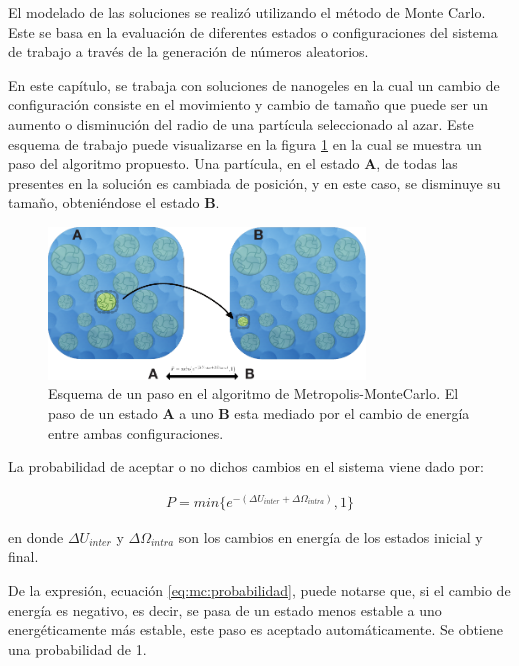 	El modelado de las soluciones se realiz\'o utilizando el m\'etodo de Monte Carlo. Este se basa en la evaluaci\'on de diferentes estados o configuraciones del sistema de trabajo a trav\'es de la generaci\'on de n\'umeros aleatorios.
	
	En este cap\'itulo, se trabaja con soluciones de nanogeles en la cual un cambio de configuraci\'on consiste en el movimiento y cambio de tama\~no que puede ser un aumento o disminuci\'on  del radio de una part\'icula seleccionado al azar. Este esquema de trabajo puede visualizarse en la figura \ref{fig:mc:pasos_mc} en la cual se muestra un paso del algoritmo propuesto. Una part\'icula, en el estado \textbf{A}, de todas las presentes en la soluci\'on es cambiada de posici\'on, y en este caso, se disminuye su tama\~no, obteni\'endose el estado \textbf{B}.
	
	\begin{figure}[!htb]
		\centering
		\includegraphics[width=0.75\textwidth]{Figures/modelos/mc_model.pdf}
		\caption{Esquema de un paso en el algoritmo de Metropolis-MonteCarlo. El paso de un estado \textbf{A} a uno \textbf{B} esta mediado por el cambio de energ\'ia entre ambas configuraciones. }
		\label{fig:mc:pasos_mc}
	\end{figure}
	
	La probabilidad de aceptar o no dichos cambios en el sistema viene dado por:
	
	\begin{align}
		P = min \{e^{-(\Delta U_{inter} + \Delta \Omega_{intra})},1\}
		\label{eq:mc:probabilidad}
	\end{align}
	
	\noindent en donde $\Delta U_{inter}$ y $\Delta\Omega_{intra}$ son los cambios en energ\'ia de los estados inicial y final. 
	
		De la expresi\'on, ecuaci\'on \ref{eq:mc:probabilidad}, puede notarse que, si el cambio de energ\'ia es negativo, es decir, se pasa de un estado menos estable a uno energ\'eticamente m\'as estable, este paso es aceptado autom\'aticamente. Se obtiene una probabilidad de 1. 
	
